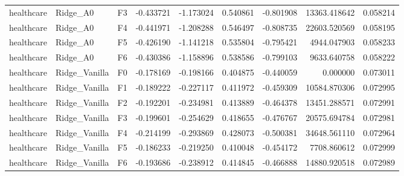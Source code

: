 \begin{tabular}{lllrrrrrr}
healthcare &                     Ridge\_A0 &  F3 & -0.433721 & -1.173024 & 0.540861 & -0.801908 &     13363.418642 &             0.058214 \\
healthcare &                     Ridge\_A0 &  F4 & -0.441971 & -1.208288 & 0.546497 & -0.808735 &     22603.520569 &             0.058195 \\
healthcare &                     Ridge\_A0 &  F5 & -0.426190 & -1.141218 & 0.535804 & -0.795421 &      4944.047903 &             0.058233 \\
healthcare &                     Ridge\_A0 &  F6 & -0.430386 & -1.158896 & 0.538586 & -0.799103 &      9633.640758 &             0.058222 \\
healthcare &                Ridge\_Vanilla &  F0 & -0.178169 & -0.198166 & 0.404875 & -0.440059 &         0.000000 &             0.073011 \\
healthcare &                Ridge\_Vanilla &  F1 & -0.189222 & -0.227117 & 0.411972 & -0.459309 &     10584.870306 &             0.072995 \\
healthcare &                Ridge\_Vanilla &  F2 & -0.192201 & -0.234981 & 0.413889 & -0.464378 &     13451.288571 &             0.072991 \\
healthcare &                Ridge\_Vanilla &  F3 & -0.199601 & -0.254629 & 0.418655 & -0.476767 &     20575.694784 &             0.072981 \\
healthcare &                Ridge\_Vanilla &  F4 & -0.214199 & -0.293869 & 0.428073 & -0.500381 &     34648.561110 &             0.072964 \\
healthcare &                Ridge\_Vanilla &  F5 & -0.186233 & -0.219250 & 0.410048 & -0.454172 &      7708.860612 &             0.072999 \\
healthcare &                Ridge\_Vanilla &  F6 & -0.193686 & -0.238912 & 0.414845 & -0.466888 &     14880.920518 &             0.072989 \\
\bottomrule
\end{tabular}
